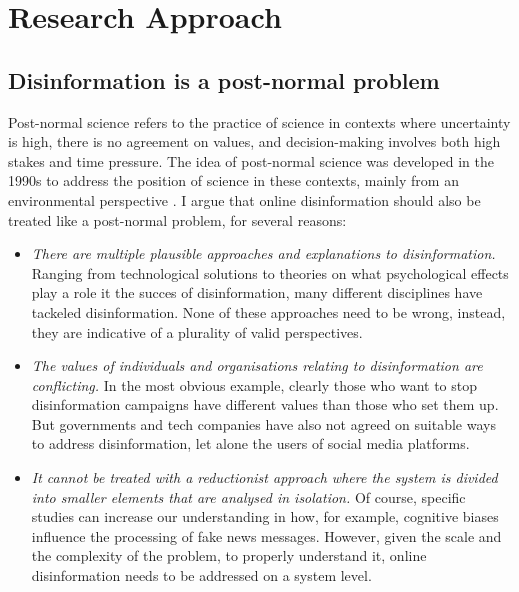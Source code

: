 \section{Research Approach}

\subsection{Disinformation is a post-normal problem}
Post-normal science refers to the practice of science in contexts where uncertainty is high, there is no agreement on values, and decision-making involves both high stakes and time pressure. The idea of post-normal science was developed in the 1990s to address the position of science in these contexts, mainly from an environmental perspective \cite{funtowicz1995science, Ravetz1999}. I argue that online disinformation should also be treated like a post-normal problem, for several reasons:
\begin{itemize}
	\item \textit{There are multiple plausible approaches and explanations to disinformation.} Ranging from technological solutions to theories on what psychological effects play a role it the succes of disinformation, many different disciplines have tackeled disinformation. None of these approaches need to be wrong, instead, they are indicative of a plurality of valid perspectives.
	\item \textit{The values of individuals and organisations relating to disinformation are conflicting.} In the most obvious example, clearly those who want to stop disinformation campaigns have different values than those who set them up. But governments and tech companies have also not agreed on suitable ways to address disinformation, let alone the users of social media platforms.
	\item \textit{It cannot be treated with a reductionist approach where the system is divided into smaller elements that are analysed in isolation.} Of course, specific studies can increase our understanding in how, for example, cognitive biases influence the processing of fake news messages. However, given the scale and the complexity of the problem, to properly understand it, online disinformation needs to be addressed on a system level.

\end{itemize}
 
